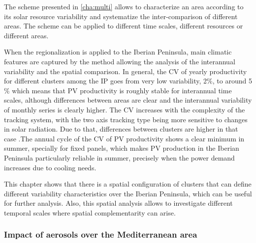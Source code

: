The scheme presented in \ref{cha:multi} allows to characterize an area according to its solar resource variability and systematize the inter-comparison of different areas. The scheme can be applied to different time scales, different resources or different areas.

When the regionalization is applied to the Iberian Peninsula, main climatic features are captured by the method allowing the analysis of the interannual variability and the spatial comparison. In general, the CV of yearly productivity for different clusters among the IP goes from very low variability, 2$\%$, to around 5$\%$ which means that PV productivity is roughly stable for interannual time scales, although differences between areas are clear and the interannual variability of monthly series is clearly higher. The CV increases with the complexity of the tracking system, with the two axis tracking type being more sensitive to changes in solar radiation. Due to that, differences between clusters are higher in that case .The annual cycle of the CV of PV productivity shows a clear minimum in summer, specially for fixed panels, which makes PV production in the Iberian Peninsula particularly reliable in summer, precisely when the power demand increases due to cooling needs.

This chapter shows that there is a spatial configuration of clusters that can define different variability characteristics over the Iberian Peninsula, which can be useful for further analysis. Also, this spatial analysis allows to investigate different temporal scales where spatial complementarity can arise. %



\subsubsection{Impact of aerosols over the Mediterranean area}

